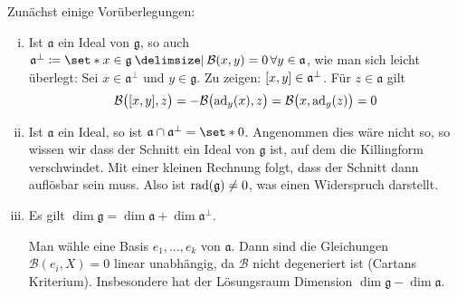 \begin{beweis}
	Zunächst einige Vorüberlegungen:
	\begin{enumerate}[i),itemsep=0pt]
		\item \label{enum:222:1} Ist $\mathfrak{a}$ ein Ideal von $\mathfrak{g}$, so auch 
		\(
			\mathfrak{a}^\perp \coloneqq \set*{x \in \mathfrak{g} \given \mathcal{B}(x,y) =0 \,\forall y \in \mathfrak{a}}
		\), wie man sich leicht überlegt:
		Sei $x \in \mathfrak{a}^\perp$ und $y \in \mathfrak{g}$. Zu zeigen: $\benbrace*{x,y} \in \mathfrak{a}^\perp$.
		Für $z \in \mathfrak{a}$ gilt
		\[
			\mathcal{B} \enbrace[\big]{\benbrace*{x,y},z} = - \mathcal{B} \enbrace[\big]{\ad_y(x), z} = \mathcal{B} \enbrace[\big]{x, \ad_y(z)} =0
		\]
		\item \label{enum:222:2} Ist $\mathfrak{a}$ ein Ideal, so ist $\mathfrak{a} \cap \mathfrak{a}^\bot = \set*{0}$.
		Angenommen dies wäre nicht so, so wissen wir dass der Schnitt ein Ideal von $\mathfrak{g}$ ist, auf dem die Killingform verschwindet.
		Mit einer kleinen Rechnung folgt, dass der Schnitt dann auflösbar sein muss.
		Also ist $\rad(\mathfrak{g}) \neq 0$, was einen Widerspruch darstellt.
		\item \label{enum:222:3} Es gilt $\dim \mathfrak{g} = \dim \mathfrak{a} + \dim \mathfrak{a}^\perp$.
		
		Man wähle eine Basis $e_1,\ldots ,e_k$ von $\mathfrak{a}$.
		Dann sind die Gleichungen $\mathcal{B}(e_i,X) =0$ linear unabhängig, da $\mathcal{B}$ nicht degeneriert ist (Cartans Kriterium).
		Insbesondere hat der Lösungsraum Dimension $\dim \mathfrak{g} - \dim \mathfrak{a}$.
		

\end{enumerate}
\end{beweis}
